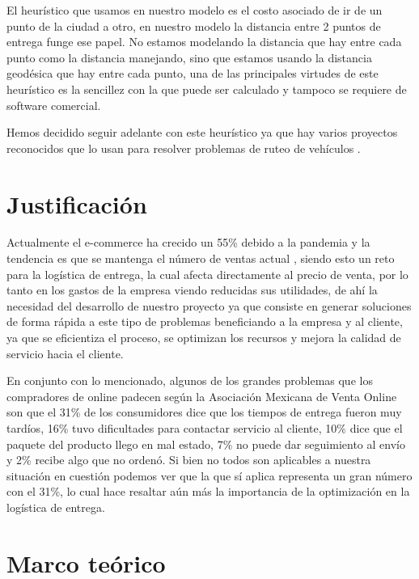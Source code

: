 \documentclass[journal]{IEEEtran}
\begin{document}
        El heurístico que usamos en nuestro modelo es el costo asociado de ir de un punto de la ciudad a otro, en nuestro modelo la distancia entre 2 puntos de entrega funge ese papel. No estamos modelando la distancia que hay entre cada punto como la distancia manejando, sino que estamos usando la distancia geodésica que hay entre cada punto, una de las principales virtudes de este heurístico es la sencillez con la que puede ser calculado y tampoco se requiere de software comercial. 
        
        Hemos decidido seguir adelante con este heurístico ya que hay varios proyectos reconocidos que lo usan para resolver problemas de ruteo de vehículos \cite{ERDOGAN201762}.

    \section{Justificación} \label{sec:justification}

        Actualmente el e-commerce ha crecido un 55\% debido a la pandemia y la tendencia es que se mantenga el número de ventas actual \cite{koetsier-2022}, siendo esto un reto para la logística de entrega, la cual afecta directamente al precio de venta, por lo tanto en los gastos de la empresa viendo reducidas sus utilidades, de ahí la necesidad del desarrollo de nuestro proyecto ya que consiste en generar soluciones de forma rápida a este tipo de problemas beneficiando a la empresa y al cliente, ya que se eficientiza el proceso, se optimizan los recursos y mejora la calidad de servicio hacia el cliente.

        En conjunto con lo mencionado, algunos de los grandes problemas que los compradores de online padecen según la Asociación Mexicana de Venta Online \cite{juarez-2021} son que el 31\% de los consumidores dice que los tiempos de entrega fueron muy tardíos, 16\% tuvo dificultades para contactar servicio al cliente, 10\% dice que el paquete del producto llego en mal estado, 7\% no puede dar seguimiento al envío y 2\% recibe algo que no ordenó. Si bien no todos son aplicables a nuestra situación en cuestión podemos ver que la que sí aplica representa un gran número con el 31\%, lo cual hace resaltar aún más la importancia de la optimización en la logística de entrega.

    \section{Marco teórico} \label{sec:theoretical}
    
\end{document}
